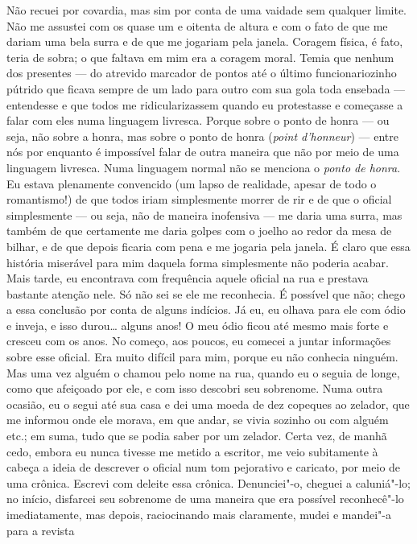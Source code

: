 Não recuei por covardia, mas sim por conta de uma vaidade sem qualquer limite.
Não me assustei com os quase um e oitenta de altura e com o fato de que me
dariam uma bela surra e de que me jogariam pela janela.  Coragem física, é
fato, teria de sobra; o que faltava em mim era a coragem moral. Temia que
nenhum dos presentes --- do atrevido marcador de pontos até o último
funcionariozinho pútrido que ficava sempre de um lado para outro com sua gola
toda ensebada --- entendesse e que todos me ridicularizassem quando eu
protestasse e começasse a falar com eles numa linguagem livresca. Porque sobre
o ponto de honra --- ou seja, não sobre a honra, mas sobre o ponto de honra
(\textit{point d'honneur}) --- entre nós por enquanto é impossível falar de
outra maneira que não por meio de uma linguagem livresca. Numa linguagem normal
não se menciona o \textit{ponto de honra}. Eu estava plenamente convencido (um lapso
de realidade, apesar de todo o romantismo!) de que todos iriam simplesmente
morrer de rir e de que o oficial simplesmente --- ou seja, não de maneira
inofensiva --- me daria uma surra, mas também de que certamente me daria golpes
com o joelho ao redor da mesa de bilhar, e de que depois ficaria com pena e me
jogaria pela janela. É claro que essa história miserável para mim daquela forma
simplesmente não poderia acabar. Mais tarde, eu encontrava com frequência
aquele oficial na rua e prestava bastante atenção nele. Só não sei se ele me
reconhecia. É possível que não; chego a essa conclusão por conta de alguns
indícios. Já eu, eu olhava para ele com ódio e inveja, e isso durou\ldots{}
alguns anos! O meu ódio ficou até mesmo mais forte e cresceu com os anos. No
começo, aos poucos, eu comecei a juntar informações sobre esse oficial. Era
muito difícil para mim, porque eu não conhecia ninguém. Mas uma vez alguém o
chamou pelo nome na rua, quando eu o seguia de longe, como que afeiçoado por
ele, e com isso descobri seu sobrenome. Numa outra ocasião, eu o segui até sua
casa e dei uma moeda de dez copeques ao zelador, que me informou onde ele
morava, em que andar, se vivia sozinho ou com alguém etc.; em suma, tudo que se
podia saber por um zelador. Certa vez, de manhã cedo, embora eu nunca tivesse
me metido a escritor, me veio subitamente à cabeça a ideia de descrever o
oficial num tom pejorativo e caricato, por meio de uma crônica. Escrevi com
deleite essa crônica. Denunciei"-o, cheguei a caluniá"-lo; no início, disfarcei
seu sobrenome de uma maneira que era possível reconhecê"-lo imediatamente, mas
depois, raciocinando mais claramente, mudei e mandei"-a para a revista
